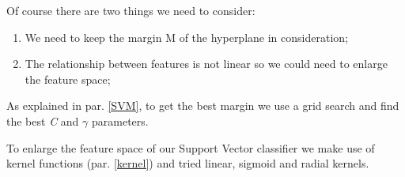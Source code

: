 Of course there are two things we need to consider:
\begin{enumerate}
	\item We need to keep the margin M of the hyperplane in consideration;
	\item The relationship between features is not linear so we could need to enlarge the feature space;
\end{enumerate}

As explained in par. \ref{SVM}, to get the best margin we use a grid search and find the best \textit{C} and $\gamma$ parameters.

To enlarge the feature space of our Support Vector classifier we make use of kernel functions (par. \ref{kernel}) and tried linear, sigmoid and radial kernels.



